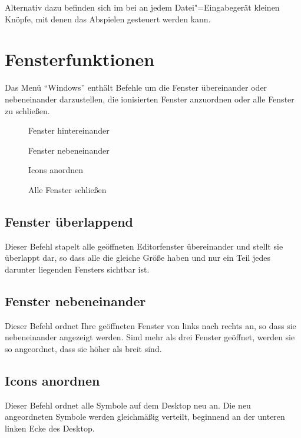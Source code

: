 Alternativ dazu befinden sich im
 bei
 an jedem
Datei"=Eingabegerät kleinen Knöpfe, mit denen das Abspielen gesteuert
werden kann.


\section{Fensterfunktionen}\label{sec:MS_WINDOW}
Das Menü "`Windows"' enthält Befehle um die Fenster übereinander 
oder nebeneinander darzustellen, die ionisierten Fenster anzuordnen 
oder alle Fenster zu schließen.

\begin{description}
\item[] Fenster hintereinander
\item[] Fenster nebeneinander
\item[] Icons anordnen
\item[] Alle Fenster schließen
\end{description}

\subsection{Fenster überlappend}
\label{sec:MI_CASCADE}

Dieser Befehl stapelt alle geöffneten Editorfenster übereinander 
und stellt sie überlappt dar, so dass alle die gleiche Größe 
haben und nur ein Teil jedes darunter liegenden Fensters sichtbar 
ist.

\subsection{Fenster nebeneinander}\label{sec:MI_TILE}

Dieser Befehl ordnet Ihre geöffneten Fenster von links nach 
rechts an, so dass sie nebeneinander angezeigt werden. Sind 
mehr als drei Fenster geöffnet, werden sie so angeordnet, dass 
sie höher als breit sind.

\subsection{Icons anordnen}\label{sec:MI_ARRANGEICONS}

Dieser Befehl ordnet alle Symbole auf dem Desktop neu an. Die 
neu angeordneten Symbole werden gleichmäßig verteilt, beginnend 
an der unteren linken Ecke des Desktop.



